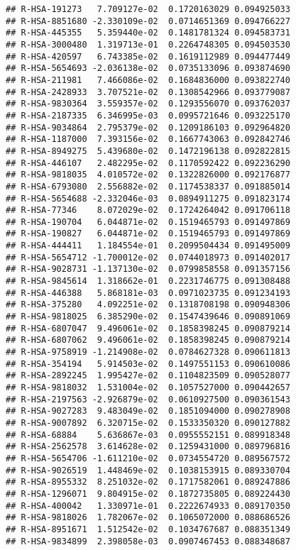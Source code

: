 \documentclass[
]{article}
\begin{document}
\begin{verbatim}
## R-HSA-191273   7.709127e-02  0.1720163029 0.094925033
## R-HSA-8851680 -2.330109e-02  0.0714651369 0.094766227
## R-HSA-445355   5.359440e-02  0.1481781324 0.094583731
## R-HSA-3000480  1.319713e-01  0.2264748305 0.094503530
## R-HSA-420597   6.743385e-02  0.1619112989 0.094477449
## R-HSA-5654693 -2.036138e-02  0.0735133096 0.093874690
## R-HSA-211981   7.466086e-02  0.1684836000 0.093822740
## R-HSA-2428933  3.707521e-02  0.1308542966 0.093779087
## R-HSA-9830364  3.559357e-02  0.1293556070 0.093762037
## R-HSA-2187335  6.346995e-03  0.0995721646 0.093225170
## R-HSA-9034864  2.795379e-02  0.1209186103 0.092964820
## R-HSA-1187000  7.393156e-02  0.1667743063 0.092842746
## R-HSA-8949275  5.439680e-02  0.1472196138 0.092822815
## R-HSA-446107   2.482295e-02  0.1170592422 0.092236290
## R-HSA-9818035  4.010572e-02  0.1322826000 0.092176877
## R-HSA-6793080  2.556882e-02  0.1174538337 0.091885014
## R-HSA-5654688 -2.332046e-03  0.0894911275 0.091823174
## R-HSA-77346    8.072029e-02  0.1724264042 0.091706118
## R-HSA-190704   6.044871e-02  0.1519465793 0.091497869
## R-HSA-190827   6.044871e-02  0.1519465793 0.091497869
## R-HSA-444411   1.184554e-01  0.2099504434 0.091495009
## R-HSA-5654712 -1.700012e-02  0.0744018973 0.091402017
## R-HSA-9028731 -1.137130e-02  0.0799858558 0.091357156
## R-HSA-9845614  1.318662e-01  0.2231746775 0.091308488
## R-HSA-446388   5.868181e-03  0.0971023735 0.091234193
## R-HSA-375280   4.092251e-02  0.1318708198 0.090948306
## R-HSA-9818025  6.385290e-02  0.1547439646 0.090891069
## R-HSA-6807047  9.496061e-02  0.1858398245 0.090879214
## R-HSA-6807062  9.496061e-02  0.1858398245 0.090879214
## R-HSA-9758919 -1.214908e-02  0.0784627328 0.090611813
## R-HSA-354194   5.914503e-02  0.1497551153 0.090610086
## R-HSA-2892245  1.995427e-02  0.1104823509 0.090528077
## R-HSA-9818032  1.531004e-02  0.1057527000 0.090442657
## R-HSA-2197563 -2.926879e-02  0.0610927500 0.090361543
## R-HSA-9027283  9.483049e-02  0.1851094000 0.090278908
## R-HSA-9007892  6.320715e-02  0.1533350320 0.090127882
## R-HSA-68884    5.636867e-03  0.0955552151 0.089918348
## R-HSA-2562578  3.614628e-02  0.1259431000 0.089796816
## R-HSA-5654706 -1.611210e-02  0.0734554720 0.089567572
## R-HSA-9026519  1.448469e-02  0.1038153915 0.089330704
## R-HSA-8955332  8.251032e-02  0.1717582061 0.089247886
## R-HSA-1296071  9.804915e-02  0.1872735805 0.089224430
## R-HSA-400042   1.330971e-01  0.2222674933 0.089170350
## R-HSA-9818026  1.782067e-02  0.1065072000 0.088686526
## R-HSA-8951671  1.512542e-02  0.1034767687 0.088351349
## R-HSA-9834899  2.398058e-03  0.0907467453 0.088348687

\end{verbatim}
\end{document}
